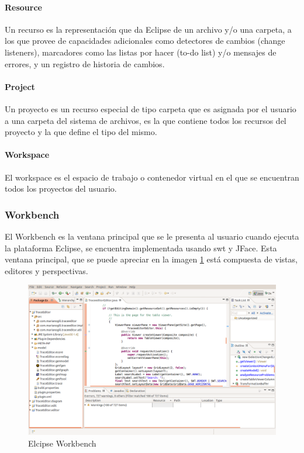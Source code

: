\documentclass[a4paper,12pt,oneside,spanish]{book}
\begin{document}
\paragraph{Resource} Un recurso es la representación que da Eclipse de un archivo y/o una carpeta, a los que provee de capacidades adicionales como detectores de cambios (change listeners), marcadores como las listas por hacer (to-do list) y/o mensajes de errores, y un registro de historia de cambios.

\paragraph{Project} Un proyecto es un recurso especial de tipo carpeta que es asignada por el usuario a una carpeta del sistema de archivos, es la que contiene todos los recursos del proyecto y la que define el tipo del mismo.

\paragraph{Workspace} El workspace es el espacio de trabajo o contenedor virtual en el que se encuentran todos los proyectos del usuario.


\subsubsection{Workbench}

El Workbench es la ventana principal que se le presenta al usuario cuando ejecuta la plataforma Eclipse, se encuentra implementada usando \gls{swt} y JFace. Esta ventana principal, que se puede apreciar en la imagen \ref{fig:EclipseWorkbench} está compuesta de vistas, editores y perspectivas.

\begin{figure}[hbtp]
\centering
\includegraphics[scale=0.3]{./img/EclipseWorkbench}
\caption{Elcipse Workbench}
\label{fig:EclipseWorkbench}
\end{figure}
\end{document}
